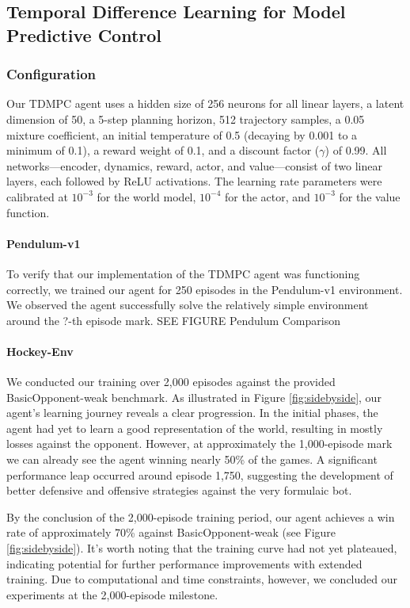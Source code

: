 \subsection{Temporal Difference Learning for Model Predictive Control}

\subsubsection{Configuration}
Our TDMPC agent uses a hidden size of 256 neurons for all linear layers, a latent dimension of 50, a 5-step planning horizon, 512 trajectory samples, a 0.05 mixture coefficient, an initial temperature of 0.5 (decaying by 0.001 to a minimum of 0.1), a reward weight of 0.1, and a discount factor ($\gamma$) of 0.99. All networks—encoder, dynamics, reward, actor, and value—consist of two linear layers, each followed by ReLU activations. The learning rate parameters were calibrated at $10^{-3}$ for the world model, $10^{-4}$ for the actor, and $10^{-3}$ for the value function.

\paragraph{Pendulum-v1}
To verify that our implementation of the TDMPC agent was functioning correctly, we trained our agent for 250 episodes in the Pendulum-v1 environment. We observed the agent successfully solve the relatively simple environment around the ?-th episode mark. SEE FIGURE Pendulum Comparison

\paragraph{Hockey-Env}
We conducted our training over 2,000 episodes against the provided BasicOpponent-weak benchmark. 
As illustrated in Figure \ref{fig:sidebyside}, our agent's learning journey reveals a clear progression. In the initial phases, the agent had yet to learn a good representation of the world, resulting in mostly losses against the opponent. However, at approximately the 1,000-episode mark we can already see the agent winning nearly 50\% of the games. A significant performance leap occurred around episode 1,750, suggesting the development of better defensive and offensive strategies against the very formulaic bot.

By the conclusion of the 2,000-episode training period, our agent achieves a win rate of approximately 70\% against BasicOpponent-weak (see Figure \ref{fig:sidebyside}). It's worth noting that the training curve had not yet plateaued, indicating potential for further performance improvements with extended training. Due to computational and time constraints, however, we concluded our experiments at the 2,000-episode milestone.

